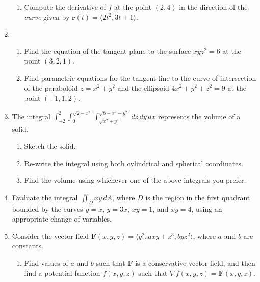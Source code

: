 \documentclass[12pt]{article}
\newcommand{\points}[1]{\marginpar{\hspace{24pt}[#1]}}
\renewcommand{\r}{\mathbf{r}}
\newcommand{\di}{\displaystyle}
\newcommand{\F}{\mathbf{F}}
\begin{document}
\begin{enumerate}
\begin{enumerate}
\item Compute the derivative of $f$ at the point $(2,4)$ in the direction of the {\em curve} given by $\r(t) = \langle 2t^2, 3t+1\rangle$. \points{4}

\end{enumerate}

\newpage

\item
\begin{enumerate}
\item Find the equation of the tangent plane to the surface $xyz^2=6$ at the point $(3,2,1)$. \points{5}

\vspace{3in}

\item Find parametric equations for the tangent line to the curve of intersection of the paraboloid $z=x^2+y^2$ and the ellipsoid $4x^2+y^2+z^2=9$ at the point $(-1,1,2)$. \points{7}

\end{enumerate}


\newpage

\item The integral $\di \int_{-2}^2\int_{0}^{\sqrt{2-x^2}}\int_{\sqrt{x^2+y^2}}^{\sqrt{8-x^2-y^2}}\,dz\,dy\,dx$ represents the volume of a solid.
\begin{enumerate}
\item Sketch the solid. \points{2}

\vspace{2in}

\item Re-write the integral using both cylindrical and spherical coordinates. \points{6}

\vspace{3in}

\item Find the volume using whichever one of the above integrals you prefer. \points{4}
\end{enumerate}
\newpage

\item Evaluate the integral $\di \iint_D xy\,dA$, where $D$ is the region in the first quadrant bounded by the curves $y=x$, $y=3x$, $xy=1$, and $xy=4$, using an appropriate change of variables. \points{10}


\newpage

\item Consider the vector field $\F(x,y,z) = \langle y^2,axy+z^3,byz^2\rangle$, where $a$ and $b$ are constants.
\begin{enumerate}
\item Find values of $a$ and $b$ such that $\F$ is a conservative vector field, and then find a potential function $f(x,y,z)$ such that $\nabla f(x,y,z) = \F(x,y,z)$. \points{8}


\end{enumerate}
\end{enumerate}
\end{document}
